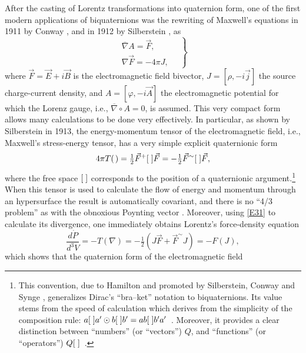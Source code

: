 \documentclass [12pt,a4paper      ]{article}
\newcommand{\CON}{\overline}          %
\newcommand{\scal}{\circ}             %
\newcommand{\Q}{[\hspace{1.mm}]} %
\newcommand{\A}{(\hspace{.5mm})} %
\newcommand{\REV}{\sim}               %
\begin{document}
After  the  casting  of Lorentz transformations  into  quaternion 
form,  one of the first modern applications of biquaternions  was 
the rewriting of Maxwell's equations in 1911 by Conway \cite{R13}, and in 1912 by Silberstein \cite{R14}, as
%
\begin{equation}\label{E31}
\left.
\begin{array}{c}
\CON{\nabla} A = \vec{F}, \\    %
\nabla \vec{F} = - 4 \pi  J,
\end{array}
\quad \right\}
\end{equation}
%
where  $\vec{F} = \vec{E}+i\vec{B}$ is the electromagnetic field {bivector}, $J = [ \rho, -i\vec{j}]$ the source charge-current density,
and $A = [\varphi, -i\vec{A}]$ the electromagnetic potential for which
the Lorenz gauge, i.e., $\CON{\nabla} \scal A = 0$, is assumed.  
This very compact form  allows many 
calculations  to  be done very effectively.   In  particular,  as 
shown  by Silberstein in 1913, the energy-momentum tensor  of 
the electromagnetic field,  i.e.,  Maxwell's stress-energy tensor, 
has a very simple explicit quaternionic form \cite{R15}
%
\begin{equation}\label{E32}
  4 \pi  T\A =  \tfrac{1}{2} \vec{F}^+    \Q \vec{F}
             = -\tfrac{1}{2} \vec{F}^\REV \Q \vec{F},  %
\end{equation}
%
where  the  free space $\Q$ corresponds to the  position  of  a quaternionic 
argument.\footnote{This convention, due to Hamilton and promoted by Silberstein, Conway and Synge \cite{R8}, generalizes Dirac's ``bra--ket'' notation to biquaternions.  Its value stems from the speed of calculation which derives from the simplicity of the composition rule: $a \Q a' \odot b \Q b' = ab \Q b'a'$~. Moreover, it provides a clear distinction between ``numbers'' (or ``vectors'') $Q$, and ``functions'' (or ``operators'')  $Q\Q$~.} When 
this  tensor is used to calculate  the  flow  of 
energy  and momentum through an hypersurface  the result 
is automatically covariant, and there is no ``4/3 problem'' as  with 
the  obnoxious  Poynting vector \cite{R16}.   Moreover,  using \eqref{E31}  to 
calculate  its  divergence, one immediately obtains Lorentz's force-density 
equation
%
\begin{equation}\label{E33}
\frac{d \dot{P}}{d^3V} = - T(\nabla)= -\tfrac{1}{2} (J\vec{F} + \vec{F}^\REV J)
                       = -F(J),  %
\end{equation}
%
which shows that the quaternion form of the electromagnetic field 
\end{document}
